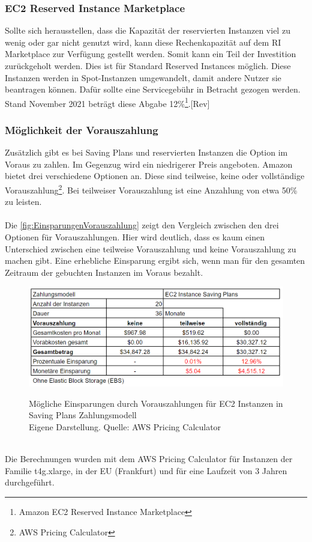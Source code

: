 \subsubsection*{EC2 Reserved Instance Marketplace}\label{sssec:RI-Marketplace}
Sollte sich herausstellen, dass die Kapazität der reservierten Instanzen viel zu wenig oder gar nicht genutzt wird, kann diese Rechenkapazität auf dem RI Marketplace zur Verfügung gestellt werden. Somit kann ein Teil der Investition zurückgeholt werden. Dies ist für Standard Reserved Instances möglich. Diese Instanzen werden in Spot-Instanzen umgewandelt, damit andere Nutzer sie beantragen können. Dafür sollte eine Servicegebühr in Betracht gezogen werden. Stand November 2021 beträgt diese Abgabe 12\%\footnote{\cite{AMZ23}Amazon EC2 Reserved Instance Marketplace}.[Rev]

\subsubsection*{Möglichkeit der Vorauszahlung}\label{sssec:Vorauszahlung}
Zusätzlich gibt es bei Saving Plans und reservierten Instanzen die Option im Voraus zu zahlen. Im Gegenzug wird ein niedrigerer Preis angeboten. Amazon bietet drei verschiedene Optionen an. Diese sind teilweise, keine oder vollständige Vorauszahlung\footnote{\cite{AMZ17} AWS Pricing Calculator}. Bei teilweiser Vorauszahlung ist eine Anzahlung von etwa 50\% zu leisten.
\\\\
Die \autoref{fig:EinsparungenVorauszahlung} zeigt den Vergleich zwischen den drei Optionen für Vorauszahlungen. Hier wird deutlich, dass es kaum einen Unterschied zwischen eine teilweise Vorauszahlung und keine Vorauszahlung zu machen gibt. Eine erhebliche Einsparung ergibt sich, wenn man für den gesamten Zeitraum der gebuchten Instanzen im Voraus bezahlt.
\begin{figure}[h!]
    \centering
    \includegraphics[scale=0.6]{sources/EinsparungenVorauszahlung}\label{fig:EinsparungenVorauszahlung}\\
    \caption[Mögliche Einsparungen durch Vorauszahlungen]{}
    \label{fig:EinsparungenVorauszahlung}Mögliche Einsparungen durch Vorauszahlungen für EC2 Instanzen in Saving Plans Zahlungsmodell\\
    Eigene Darstellung. Quelle: {\cite{AMZ17}AWS Pricing Calculator}
  \end{figure}
  \\
Die Berechnungen wurden mit dem AWS Pricing Calculator {\cite{AMZ17}} für Instanzen der Familie t4g.xlarge, in der EU (Frankfurt) und für eine Laufzeit von 3 Jahren durchgeführt. 
